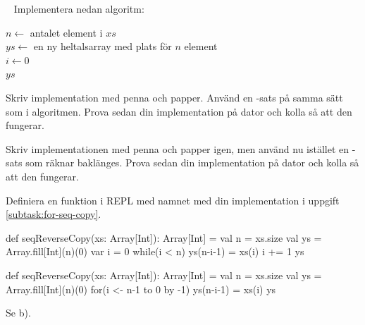 




\QUESTBEGIN

\Task  \what~  Implementera nedan algoritm:

\begin{algorithm}[H]

 $n \leftarrow$ antalet element i $xs$ \\
 $ys \leftarrow$ en ny heltalsarray med plats för $n$ element\\
 $i \leftarrow 0$  \\
 \Return $ys$
\end{algorithm}

\Subtask\Pen Skriv implementation med penna och papper. Använd en -sats på samma sätt som i algoritmen. Prova sedan din implementation på dator och kolla så att den fungerar.

\Subtask\Pen \label{subtask:for-seq-copy} Skriv implementationen med penna och papper igen, men använd nu istället en -sats som räknar baklänges. Prova sedan din implementation på dator och kolla så att den fungerar.

\Subtask Definiera en funktion i REPL med namnet  med din implementation i uppgift \ref{subtask:for-seq-copy}.


\SOLUTION


\TaskSolved \what


\SubtaskSolved  \begin{Code}
def seqReverseCopy(xs: Array[Int]): Array[Int] = {
  val n = xs.size
  val ys = Array.fill[Int](n)(0)
  var i = 0
  while(i < n) {
    ys(n-i-1) = xs(i)
    i += 1
  }
  ys
}
\end{Code}

\SubtaskSolved  \begin{Code}
def seqReverseCopy(xs: Array[Int]): Array[Int] = {
  val n = xs.size
  val ys = Array.fill[Int](n)(0)
  for(i <- n-1 to 0 by -1) ys(n-i-1) = xs(i)
  ys
}
\end{Code}

\SubtaskSolved  Se b).



